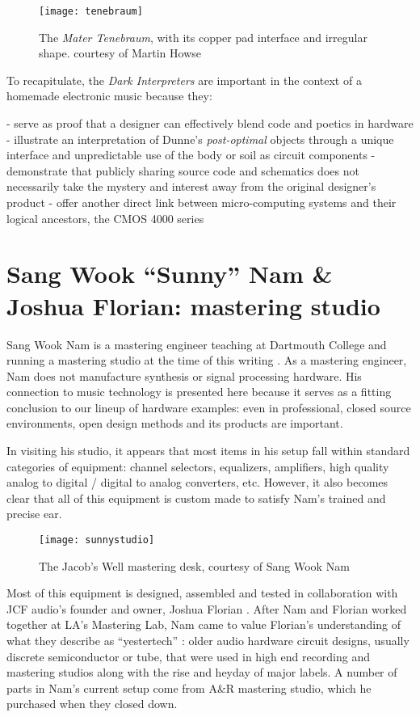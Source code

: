 \begin{figure}[H]
	  \centering
	    \texttt{[image: tenebraum]}
	     \caption{The \textit{Mater Tenebraum}, with its copper pad interface and irregular shape. courtesy of Martin Howse}
	\end{figure}

To recapitulate, the \emph{Dark Interpreters} are important in the context of a homemade electronic music because they: 

- serve as proof that a designer can effectively blend code and poetics in hardware 
- illustrate an interpretation of Dunne's \emph{post-optimal} objects through a unique interface and unpredictable use of the body or soil as circuit components
- demonstrate that publicly sharing source code and schematics does not necessarily take the mystery and interest away from the original designer's product
- offer another direct link between micro-computing systems and their logical ancestors, the CMOS 4000 series

\section{Sang Wook ``Sunny'' Nam \& Joshua Florian: mastering studio}

Sang Wook Nam is a mastering engineer teaching at Dartmouth College and running a mastering studio at the time of this writing \citep{nam2015}. As a mastering engineer, Nam does not manufacture synthesis or signal processing hardware. His connection to music technology is presented here because it serves as a fitting conclusion to our lineup of hardware examples: even in professional, closed source environments, open design methods and its products are important. 

In visiting his studio, it appears that most items in his setup fall within standard categories of equipment: channel selectors, equalizers, amplifiers, high quality analog to digital / digital to analog converters, etc. However, it also becomes clear that all of this equipment is custom made to satisfy Nam's trained and precise ear. 

	\begin{figure}[H]
	  \centering
	    \texttt{[image: sunnystudio]}
	    \caption{The Jacob's Well mastering desk, courtesy of Sang Wook Nam}
	\end{figure}
	
Most of this equipment is designed, assembled and tested in collaboration with JCF audio's founder and owner, Joshua Florian \citep{florian2015}. After Nam and Florian worked together at LA's Mastering Lab, Nam came to value Florian's understanding of what they describe as ``yestertech'' \citep{florian2015b}: older audio hardware circuit designs, usually discrete semiconductor or tube, that were used in high end recording and mastering studios along with the rise and heyday of major labels. A number of parts in Nam's current setup come from A\&R mastering studio, which he purchased when they closed down. 


